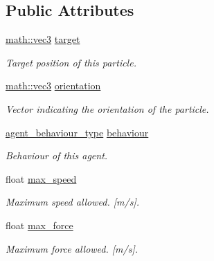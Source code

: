 \subsection*{Public Attributes}
\begin{DoxyCompactItemize}
\item 
\hyperlink{structphysim_1_1math_1_1vec3}{math\+::vec3} \hyperlink{classphysim_1_1particles_1_1agent__particle_a0658207e11a5d39844856233ae8bf2cb}{target}
\begin{DoxyCompactList}\small\item\em Target position of this particle. \end{DoxyCompactList}\item 
\hyperlink{structphysim_1_1math_1_1vec3}{math\+::vec3} \hyperlink{classphysim_1_1particles_1_1agent__particle_a87b2554699454e6850f1d2b48e278f63}{orientation}
\begin{DoxyCompactList}\small\item\em Vector indicating the orientation of the particle. \end{DoxyCompactList}\item 
\mbox{\label{classphysim_1_1particles_1_1agent__particle_af219e3f46630bb7f51f3d00952ed4f1c}} 
\hyperlink{namespacephysim_1_1particles_a033757595f7862a0fc8a389d79bf9c88}{agent\+\_\+behaviour\+\_\+type} \hyperlink{classphysim_1_1particles_1_1agent__particle_af219e3f46630bb7f51f3d00952ed4f1c}{behaviour}
\begin{DoxyCompactList}\small\item\em Behaviour of this agent. \end{DoxyCompactList}\item 
float \hyperlink{classphysim_1_1particles_1_1agent__particle_a3e34a9a7fc82cbad0226b7b925b5ba22}{max\+\_\+speed}
\begin{DoxyCompactList}\small\item\em Maximum speed allowed. \mbox{[}m/s\mbox{]}. \end{DoxyCompactList}\item 
float \hyperlink{classphysim_1_1particles_1_1agent__particle_a57909cb85564f4432754000ed570d88a}{max\+\_\+force}
\begin{DoxyCompactList}\small\item\em Maximum force allowed. \mbox{[}m/s\mbox{]}. \end{DoxyCompactList}\item 
\mbox{\label{classphysim_1_1particles_1_1agent__particle_a119da4916df4f5c52f13170725295f20}} 

\end{DoxyCompactItemize}
